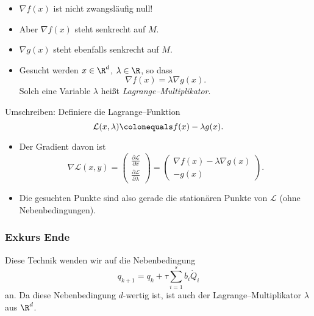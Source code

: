 \begin{itemize}
\item $\nabla f(x)$ ist nicht zwangsläufig null!
\item Aber $\nabla f(x)$ steht senkrecht auf $M$.
\item $\nabla g(x)$ steht ebenfalls senkrecht auf $M$.
\item Gesucht werden $x\in\R^d$, $\lambda \in\R$, so dass
\begin{equation*}
  \nabla f(x) = \lambda \nabla g(x).
\end{equation*}
Solch eine Variable $\lambda$ heißt \emph{Lagrange--Multiplikator}.
\end{itemize}

\bigskip

Umschreiben: Definiere die Lagrange--Funktion
\begin{equation*}
\mathcal{L}(x,\lambda) \colonequals f(x) - \lambda g(x).
\end{equation*}
\begin{itemize}
\item Der Gradient davon ist
\begin{equation*}
\nabla\mathcal{L}(x,y)
=
\begin{pmatrix}
 \frac{\partial\mathcal{L}}{\partial x} \\
 \frac{\partial\mathcal{L}}{\partial \lambda}
\end{pmatrix}
=
\begin{pmatrix}
\nabla f(x) - \lambda \nabla g(x) \\ -g(x)
\end{pmatrix}.
\end{equation*}
\item Die gesuchten Punkte sind also gerade die stationären Punkte von $\mathcal{L}$ (ohne Nebenbedingungen).
\end{itemize}

\subsubsection{Exkurs Ende}

Diese Technik wenden wir auf die Nebenbedingung
\begin{equation*}
q_{k+1} = q_k + \tau\sum_{i=1}^s b_i\dot{Q}_i
\end{equation*}
an. Da diese Nebenbedingung $d$-wertig ist, ist auch der Lagrange--Multiplikator $\lambda$ aus $\R^d$.

\medskip

